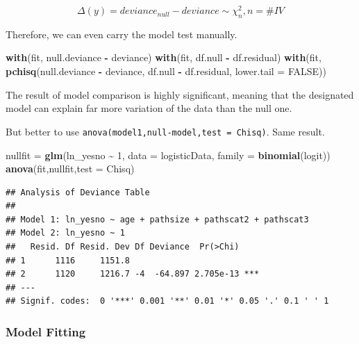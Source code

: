 \documentclass[
]{ctexart}
\newenvironment{Shaded}{\begin{snugshade}}{\end{snugshade}}
\newcommand{\AttributeTok}[1]{\textcolor[rgb]{0.13,0.29,0.53}{#1}}
\newcommand{\ConstantTok}[1]{\textcolor[rgb]{0.56,0.35,0.01}{#1}}
\newcommand{\DecValTok}[1]{\textcolor[rgb]{0.00,0.00,0.81}{#1}}
\newcommand{\FunctionTok}[1]{\textcolor[rgb]{0.13,0.29,0.53}{\textbf{#1}}}
\newcommand{\NormalTok}[1]{#1}
\newcommand{\OtherTok}[1]{\textcolor[rgb]{0.56,0.35,0.01}{#1}}
\newcommand{\SpecialCharTok}[1]{\textcolor[rgb]{0.81,0.36,0.00}{\textbf{#1}}}
\newcommand{\StringTok}[1]{\textcolor[rgb]{0.31,0.60,0.02}{#1}}
\begin{document}
\[
\Delta(y)=deviance_{null}-deviance\sim \chi^2_n,n=\#IV
\]

Therefore, we can even carry the model test manually.

\begin{Shaded}
\begin{Highlighting}[]
\FunctionTok{with}\NormalTok{(fit, null.deviance }\SpecialCharTok{{-}}\NormalTok{ deviance)}
\FunctionTok{with}\NormalTok{(fit, df.null }\SpecialCharTok{{-}}\NormalTok{ df.residual)}
\FunctionTok{with}\NormalTok{(fit, }\FunctionTok{pchisq}\NormalTok{(null.deviance }\SpecialCharTok{{-}}\NormalTok{ deviance, }
\NormalTok{                 df.null }\SpecialCharTok{{-}}\NormalTok{ df.residual, }
                 \AttributeTok{lower.tail =} \ConstantTok{FALSE}\NormalTok{))}
\end{Highlighting}
\end{Shaded}

The result of model comparison is highly significant, meaning that the
designated model can explain far more variation of the data than the
null one.

But better to use
\texttt{anova(model1,null-model,test\ =\ \textquotesingle{}Chisq\textquotesingle{})}.
Same result.

\begin{Shaded}
\begin{Highlighting}[]
\NormalTok{nullfit }\OtherTok{=} \FunctionTok{glm}\NormalTok{(ln\_yesno }\SpecialCharTok{\textasciitilde{}} \DecValTok{1}\NormalTok{,}
          \AttributeTok{data =}\NormalTok{ logisticData,}
          \AttributeTok{family =} \FunctionTok{binomial}\NormalTok{(}\StringTok{\textquotesingle{}logit\textquotesingle{}}\NormalTok{))}
\FunctionTok{anova}\NormalTok{(fit,nullfit,}\AttributeTok{test =} \StringTok{\textquotesingle{}Chisq\textquotesingle{}}\NormalTok{)}
\end{Highlighting}
\end{Shaded}

\begin{verbatim}
## Analysis of Deviance Table
## 
## Model 1: ln_yesno ~ age + pathsize + pathscat2 + pathscat3
## Model 2: ln_yesno ~ 1
##   Resid. Df Resid. Dev Df Deviance  Pr(>Chi)    
## 1      1116     1151.8                          
## 2      1120     1216.7 -4  -64.897 2.705e-13 ***
## ---
## Signif. codes:  0 '***' 0.001 '**' 0.01 '*' 0.05 '.' 0.1 ' ' 1
\end{verbatim}

\hypertarget{model-fitting}{%
\subsubsection{Model Fitting}\label{model-fitting}}
\end{document}
